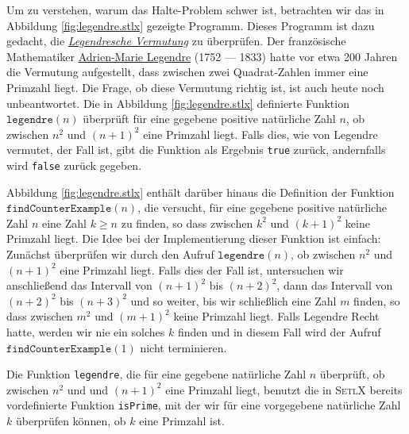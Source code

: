 Um zu verstehen, warum das Halte-Problem schwer ist, betrachten wir  
das in Abbildung \ref{fig:legendre.stlx} gezeigte Programm. 
Dieses Programm ist dazu gedacht, die
\href{http://de.wikipedia.org/wiki/Legendresche_Vermutung}{\emph{Legendresche Vermutung}} zu
überprüfen.  Der französische 
Mathematiker  \href{http://de.wikipedia.org/wiki/Adrien-Marie_Legendre}{Adrien-Marie Legendre} 
(1752 --- 1833) hatte vor etwa 200 Jahren die Vermutung 
aufgestellt, dass zwischen zwei Quadrat-Zahlen immer eine Primzahl liegt.  Die Frage, ob diese
Vermutung richtig ist, ist auch heute noch unbeantwortet.  Die in Abbildung \ref{fig:legendre.stlx}
definierte Funktion $\texttt{legendre}(n)$ überprüft für eine gegebene positive natürliche Zahl $n$,
ob zwischen $n^2$ und $(n+1)^2$ eine Primzahl liegt.  Falls dies, wie von Legendre vermutet, der
Fall ist, gibt die Funktion als Ergebnis \texttt{true} zurück, andernfalls wird \texttt{false}
zurück gegeben.

Abbildung \ref{fig:legendre.stlx} enthält darüber hinaus die Definition der Funktion
$\texttt{findCounterExample}(n)$, die versucht, für eine gegebene positive natürliche Zahl $n$ eine
Zahl $k \geq n$ zu finden, so dass zwischen $k^2$ und $(k+1)^2$ keine Primzahl liegt.  Die Idee bei
der Implementierung dieser Funktion ist einfach:  Zunächst überprüfen wir durch den Aufruf
$\texttt{legendre}(n)$, ob zwischen $n^2$ und $(n+1)^2$
eine Primzahl liegt.  Falls dies der Fall ist, untersuchen wir anschließend das Intervall von
$(n+1)^2$ bis $(n+2)^2$, dann das Intervall von 
$(n+2)^2$ bis $(n+3)^2$ und so weiter, bis wir schließlich eine Zahl $m$ finden, so dass zwischen
$m^2$ und $(m+1)^2$ keine Primzahl liegt.  Falls Legendre Recht hatte, werden wir nie ein solches
$k$ finden und in diesem Fall wird der Aufruf $\texttt{findCounterExample}(1)$ nicht terminieren. 

Die Funktion \texttt{legendre}, die für eine gegebene natürliche Zahl $n$ überprüft, ob zwischen $n^2$ und und
$(n+1)^2$ eine Primzahl liegt, benutzt die in \textsc{SetlX} bereits vordefinierte Funktion \texttt{isPrime},
mit der wir für eine vorgegebene natürliche Zahl $k$ überprüfen können, ob $k$ eine Primzahl ist.


